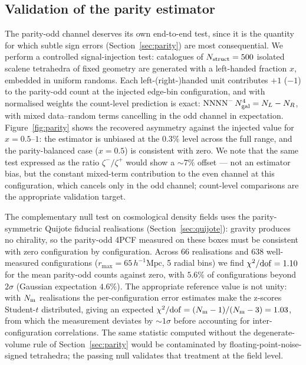 \documentclass[twocolumn]{aastex701}
\newcommand{\rmax}{r_{\mathrm{max}}}
\newcommand{\Mpch}{\,h^{-1}\mathrm{Mpc}}
\begin{document}
\subsection{Validation of the parity estimator}
\label{sec:paritytest}

The parity-odd channel deserves its own end-to-end test, since it is the
quantity for which subtle sign errors (Section~\ref{sec:parity}) are most
consequential.  We perform a controlled signal-injection test: catalogues
of $N_{\rm struct} = 500$ isolated scalene tetrahedra of fixed geometry
are generated with a left-handed fraction $x$, embedded in uniform
randoms.  Each left-(right-)handed unit contributes $+1$ ($-1$) to the
parity-odd count at the injected edge-bin configuration, and with
normalised weights the count-level prediction is exact:
$\mathrm{NNNN}^{-}\,N_{\rm gal}^{4} = N_L - N_R$, with mixed data--random
terms cancelling in the odd channel in expectation.
Figure~\ref{fig:parity} shows the recovered asymmetry against the
injected value for $x = 0.5$--$1$: the estimator is unbiased at the
$0.3\%$ level across the full range, and the parity-balanced case
($x=0.5$) is consistent with zero.  We note that the same test expressed
as the ratio $\zeta^{-}/\zeta^{+}$ would show a ${\sim}7\%$ offset --- not
an estimator bias, but the constant mixed-term contribution to the even
channel at this configuration, which cancels only in the odd channel;
count-level comparisons are the appropriate validation target.

The complementary null test on cosmological density fields uses the
parity-symmetric Quijote fiducial realisations
(Section~\ref{sec:quijote}): gravity produces no chirality, so the
parity-odd 4PCF measured on these boxes must be consistent with zero
configuration by configuration.  Across 66 realisations
and 638 well-measured configurations ($\rmax = 65\Mpch$, 5 radial bins)
we find $\chi^2/{\rm dof} = 1.10$ for the mean parity-odd counts against
zero, with $5.6\%$ of configurations beyond $2\sigma$ (Gaussian
expectation $4.6\%$).  The appropriate reference value is not unity:
with $N_{\rm m}$ realisations the per-configuration error estimates make
the z-scores Student-$t$ distributed, giving an expected
$\chi^2/{\rm dof} = (N_{\rm m}-1)/(N_{\rm m}-3) = 1.03$, from which the
measurement deviates by ${\sim}1\sigma$ before accounting for
inter-configuration correlations.  The same statistic computed without
the degenerate-volume rule of Section~\ref{sec:parity} would be
contaminated by floating-point-noise-signed tetrahedra; the passing null
validates that treatment at the field level.
\end{document}
